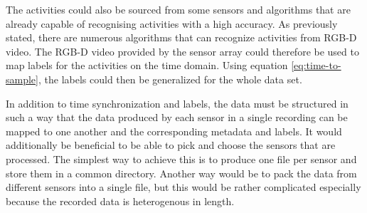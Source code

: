 The activities could also be sourced from some sensors and algorithms that are 
already capable of recognising activities with a high accuracy.
As previously stated, there are numerous algorithms that can recognize activities from RGB-D video.
The RGB-D video provided by the sensor array could therefore be used to map labels for the activities on the time domain.
Using equation \ref{eq:time-to-sample}, the labels could then be generalized for the whole data set.

In addition to time synchronization and labels,
the data must be structured in such a way that the data produced by each sensor in a single recording
can be mapped to one another and the corresponding metadata and labels.
It would additionally be beneficial to be able to pick and choose the sensors that are processed.
The simplest way to achieve this is to produce one file per sensor and store them in a common directory.
Another way would be to pack the data from different sensors into a single file,
but this would be rather complicated especially because the recorded data is heterogenous in length.